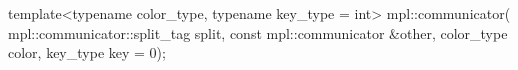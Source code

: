 template<typename color_type, typename key_type = int>
mpl::communicator(
    mpl::communicator::split_tag split,
    const mpl::communicator &other,
    color_type color,
    key_type key = 0);
